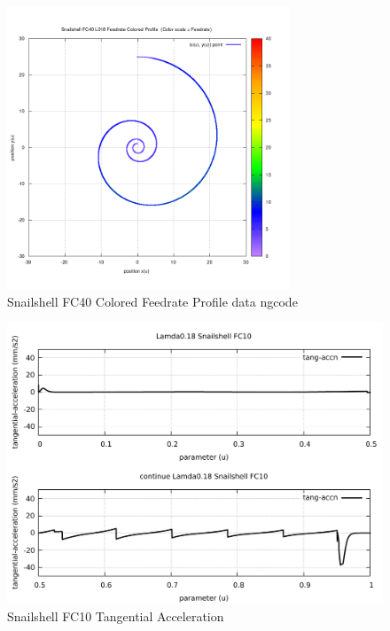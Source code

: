 \begin{figure}
	\caption     {Snailshell FC40 Colored Feedrate Profile data ngcode}
	\label{20-img-Snailshell-FC40-Colored-Feedrate-Profile-data_ngcode.png}
	\includegraphics[width=0.75\textwidth]{Chap4/appendix/app-Snailshell/plots/20-img-Snailshell-FC40-Colored-Feedrate-Profile-data_ngcode.png}
\end{figure}

\clearpage
\pagebreak

\begin{figure}
	\caption     {Snailshell FC10 Tangential Acceleration}
	\label{21-img-Snailshell-FC10-Tangential-Acceleration.pdf}
	\includegraphics[width=1.00\textwidth]{Chap4/appendix/app-Snailshell/plots/21-img-Snailshell-FC10-Tangential-Acceleration.pdf}
\end{figure}


